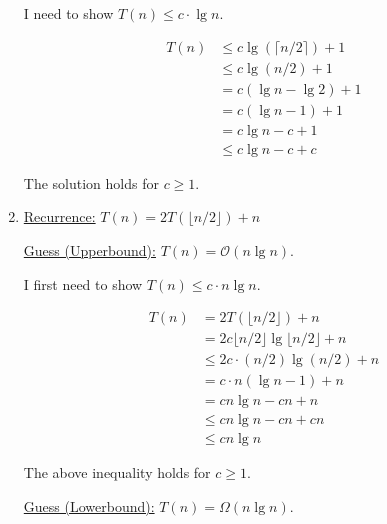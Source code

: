\documentclass[12pt]{article}
\begin{document}
\begin{enumerate}[1.]
\begin{mdframed}
        \bigskip

        I need to show $T(n) \leq c \cdot \lg n$.

        \bigskip

        \begin{align}
            T(n) &\leq c\lg (\lceil n/2 \rceil) + 1\\
            &\leq c \lg (n/2) + 1 \\
            &= c (\lg n - \lg 2) + 1\\
            &= c (\lg n - 1) + 1\\
            &= c\lg n - c + 1\\
            &\leq c\lg n - c + c
        \end{align}

        \bigskip

        \color{red}The solution holds for $c \geq 1$.\color{black}

    \end{mdframed}

    \item
    \setcounter{equation}{0}
    \bigskip

    \underline{Recurrence:} $T(n) = 2T(\lfloor n/2 \rfloor) + n$

    \bigskip

    \underline{Guess (Upperbound):} $T(n) = \mathcal{O}(n\lg n)$.

    \bigskip

    I first need to show $T(n) \leq c \cdot n \lg n$.

    \bigskip

    \begin{align}
        T(n) &= 2T(\lfloor n/2 \rfloor) + n\\
        &= 2 c \lfloor n/2 \rfloor \lg \lfloor n/2 \rfloor + n\\
        &\leq 2 c \cdot (n/2) \lg (n/2) + n\\
        &= c \cdot n (\lg n - 1) + n\\
        &= cn \lg n - cn + n\\
        &\leq cn \lg n - cn + cn\\
        &\leq cn \lg n
    \end{align}

    \bigskip

    The above inequality holds for $c \geq 1$.

    \bigskip

    \underline{Guess (Lowerbound):} $T(n) = \Omega(n\lg n)$.


\end{enumerate}
\end{document}
